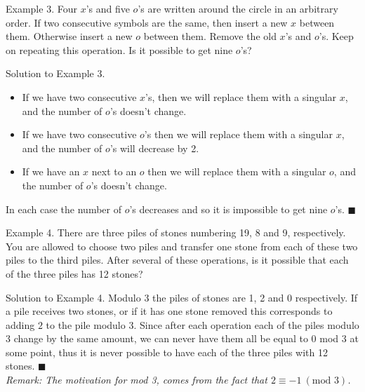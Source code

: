 \documentclass{article}
\begin{document}
\begin{problem}{Example 3.}
Four $x$’s and five $o$’s are
written around the circle in an arbitrary
order. If two consecutive symbols are the
same, then insert a new $x$ between them.
Otherwise insert a new $o$ between them.
Remove the old $x$’s and $o$’s. Keep on
repeating this operation. Is it possible to
get nine $o$’s?
\end{problem}

\begin{solution}{Solution to Example 3.}
\begin{itemize}
\item If we have two consecutive $x$'s, then we will replace them with a
singular $x$, and the number of $o$'s doesn't change.
\item If we have two consecutive $o$'s then we will replace them with a
singular $x$, and the number of $o$'s will decrease by 2.
\item If we have an $x$ next to an $o$ then we will replace them with a
singular $o$, and the number of $o$'s doesn't change.
\end{itemize}

In each case the number of $o$'s decreases and so it is impossible to get
nine $o$'s. $\blacksquare$
\end{solution}
\vspace{0.2cm}

\begin{problem}{Example 4.}
There are three piles of
stones numbering 19, 8 and 9,
respectively. You are allowed to choose
two piles and transfer one stone from
each of these two piles to the third piles.
After several of these operations, is it
possible that each of the three piles has
12 stones?
\end{problem}

\begin{solution}{Solution to Example 4.}
Modulo 3 the piles of stones are 1, 2 and 0 respectively. If a pile receives
two stones, or if it has one stone removed this corresponds to adding
$2$ to the pile modulo 3. Since after each operation each of the piles
modulo 3 change by the same amount, we can never have them all be equal
to 0 mod 3 at some point, thus it is never possible to have each of the
three piles with 12 stones. $\blacksquare$
\\

\textit{Remark: The motivation for mod 3, comes from the fact that $2
\equiv -1 \ (\text{mod } 3)$.}
\end{solution}
\end{document}
